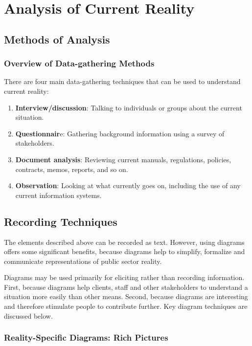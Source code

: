 \section{Analysis of Current Reality}
\subsection{Methods of Analysis}
\subsubsection*{Overview of Data-gathering Methods}


There are four main data-gathering
techniques that can be used to understand
current reality: 

\begin{enumerate}
\item \textbf{Interview/discussion}: Talking to individuals
or groups about the current situation.

\item \textbf{Questionnair}e: Gathering background information using a survey of stakeholders.

\item \textbf{Document analysis}: Reviewing current
manuals, regulations, policies, contracts,
memos, reports, and so on.

\item \textbf{Observation}: Looking at what currently
goes on, including the use of any current
information systems.
\end{enumerate}

\subsection{Recording Techniques}
The elements described above can be recorded
as text. However, using diagrams offers some
significant benefits, because diagrams help to
simplify, formalize and communicate representations of public sector reality.


Diagrams may be used
primarily for eliciting rather than recording
information. First, because diagrams help
clients, staff and other stakeholders to
understand a situation more easily than
other means. Second, because diagrams are
interesting and therefore stimulate people to
contribute further. Key diagram techniques
are discussed below.


\subsubsection*{Reality-Specific Diagrams:	Rich Pictures}

